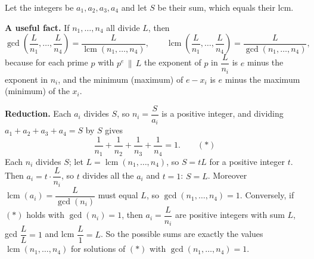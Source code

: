 Let the integers be $a_1,a_2,a_3,a_4$ and let $S$ be their sum, which equals their lcm.

\textbf{A useful fact.} If $n_1,\dots,n_4$ all divide $L$, then
\[
\gcd\left(\dfrac{L}{n_1},\dots,\dfrac{L}{n_4}\right)=\dfrac{L}{\operatorname{lcm}(n_1,\dots,n_4)},\qquad \operatorname{lcm}\left(\dfrac{L}{n_1},\dots,\dfrac{L}{n_4}\right)=\dfrac{L}{\gcd(n_1,\dots,n_4)},
\]
because for each prime $p$ with $p^e\,\|\,L$ the exponent of $p$ in $\dfrac{L}{n_i}$ is $e$ minus the exponent in $n_i$, and the minimum (maximum) of $e-x_i$ is $e$ minus the maximum (minimum) of the $x_i$.

\textbf{Reduction.} Each $a_i$ divides $S$, so $n_i=\dfrac{S}{a_i}$ is a positive integer, and dividing $a_1+a_2+a_3+a_4=S$ by $S$ gives
\[
\dfrac{1}{n_1}+\dfrac{1}{n_2}+\dfrac{1}{n_3}+\dfrac{1}{n_4}=1 . \qquad (\ast)
\]
Each $n_i$ divides $S$; let $L=\operatorname{lcm}(n_1,\dots,n_4)$, so $S=tL$ for a positive integer $t$. Then $a_i=t\cdot\dfrac{L}{n_i}$, so $t$ divides all the $a_i$ and $t=1$: $S=L$. Moreover $\operatorname{lcm}(a_i)=\dfrac{L}{\gcd(n_i)}$ must equal $L$, so $\gcd(n_1,\dots,n_4)=1$. Conversely, if $(\ast)$ holds with $\gcd(n_i)=1$, then $a_i=\dfrac{L}{n_i}$ are positive integers with sum $L$, gcd $\dfrac{L}{L}=1$ and lcm $\dfrac{L}{1}=L$. So the possible sums are exactly the values $\operatorname{lcm}(n_1,\dots,n_4)$ for solutions of $(\ast)$ with $\gcd(n_1,\dots,n_4)=1$.

